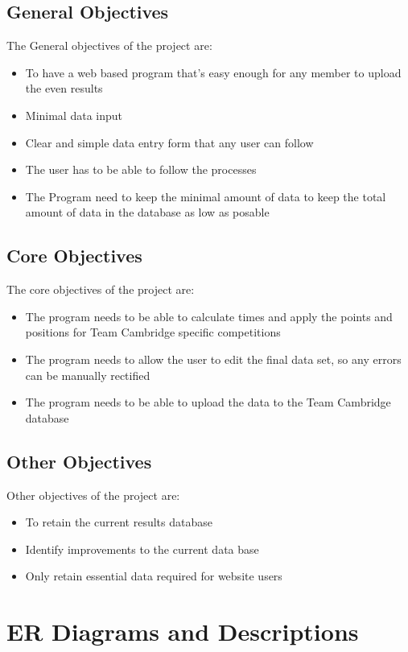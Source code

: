 \subsection{General Objectives}
The General objectives of the project are:
\begin{itemize}
	\item To have a web based program that's easy enough for any member to upload the even results
	\item Minimal data input
	\item Clear and simple data entry form that any user can follow
	\item The user has to be able to follow the processes
	\item The Program need to keep the minimal amount of data to keep the total amount of data in the database as low as posable
\end{itemize}

\subsection{Core Objectives}
The core objectives of the project are:
\begin{itemize}
	\item The program needs to be able to calculate times and apply the points and positions for Team Cambridge specific competitions
	\item The program needs to allow the user to edit the final data set, so any errors can be manually rectified
	\item The program needs to be able to upload the data to the Team Cambridge database
\end{itemize}
\subsection{Other Objectives}
Other objectives of the project are:
\begin{itemize}
	\item To retain the current results database
	\item Identify improvements to the current data base
	\item Only retain essential data required for website users 
\end{itemize}

\section{ER Diagrams and Descriptions}

